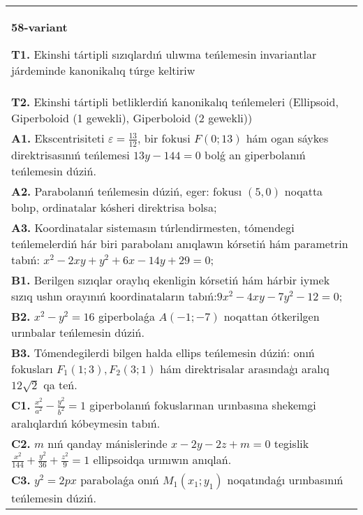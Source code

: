 \documentclass{article}
\begin{document}
\begin{tabular}{m{17cm}}
\textbf{58-variant}
\newline

\textbf{T1.} Ekinshi tártipli sızıqlardıń ulıwma teńlemesin invariantlar járdeminde kanonikalıq túrge keltiriw \\
\textbf{T2.} Ekinshi tártipli betliklerdiń kanonikalıq teńlemeleri (Ellipsoid, Giperboloid (1 gewekli), Giperboloid (2 gewekli)) \\
\textbf{A1.} Ekscentrisiteti $\varepsilon=\frac{13}{12}$, bir fokusi $F (0; 13) $ hám ogan sáykes direktrisasınıń teńlemesi $13 y-144=0$ bolǵ an giperbolanıń teńlemesin dúziń. \\
\textbf{A2.} Parabolanıń teńlemesin dúziń, eger: fokusı $ (5,0) $ noqatta bolıp, ordinatalar kósheri direktrisa bolsa; \\
\textbf{A3.} Koordinatalar sistemasın túrlendirmesten, tómendegi teńlemelerdiń hár biri parabolanı anıqlawın kórsetiń hám parametrin tabıń: $x^2-2 x y+y^2+6 x-14 y+29=0$; \\
\textbf{B1.} Berilgen sızıqlar oraylıq ekenligin kórsetiń hám hárbir iymek sızıq ushın orayınıń koordinataların tabıń:$9 x^2-4 x y-7 y^2-12=0$; \\
\textbf{B2.} $x^2-y^2=16$ giperbolaǵa $A (-1;-7)$ noqattan ótkerilgen urınbalar teńlemesin dúziń. \\
\textbf{B3.} Tómendegilerdi bilgen halda ellips teńlemesin dúziń: onıń fokusları $F_1 (1; 3), F_2 (3; 1) $ hám direktrisalar arasındaģı aralıq $12 \sqrt{2}$ qa teń. \\
\textbf{C1.} $\frac{x^2}{a^2}-\frac{y^2}{b^2}=1$ giperbolanıń fokuslarınan urınbasına shekemgi aralıqlardıń kóbeymesin tabıń. \\
\textbf{C2.} $m$ nıń qanday mánislerinde $x-2 y-2 z+m=0$ tegislik $\frac{x^2}{144}+\frac{y^2}{36}+\frac{z^2}{9}=1$ ellipsoidqa urınıwın anıqlań. \\
\textbf{C3.} $y^2=2 p x$ parabolaǵa onıń $M_1\left(x_1; y_1\right) $ noqatındaǵı urınbasınıń teńlemesin dúziń. \\

\end{tabular}
\vspace{1cm}
\end{document}
